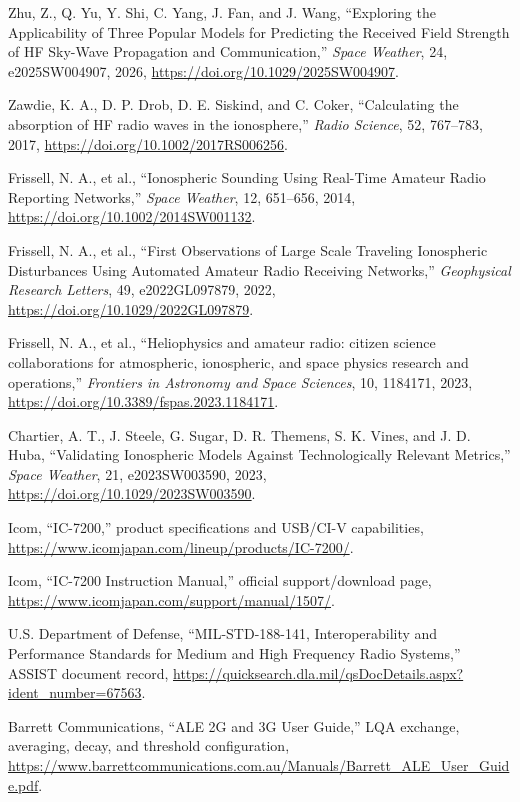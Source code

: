 \documentclass[11pt,a4paper]{article}
\begin{document}
\begin{enumerate}[label={[\arabic*]}]
  \item Zhu, Z., Q. Yu, Y. Shi, C. Yang, J. Fan, and J. Wang, “Exploring the Applicability of Three Popular Models for Predicting the Received Field Strength of HF Sky-Wave Propagation and Communication,” \emph{Space Weather}, 24, e2025SW004907, 2026, \url{https://doi.org/10.1029/2025SW004907}.
  \item Zawdie, K. A., D. P. Drob, D. E. Siskind, and C. Coker, “Calculating the absorption of HF radio waves in the ionosphere,” \emph{Radio Science}, 52, 767--783, 2017, \url{https://doi.org/10.1002/2017RS006256}.
  \item Frissell, N. A., et al., “Ionospheric Sounding Using Real-Time Amateur Radio Reporting Networks,” \emph{Space Weather}, 12, 651--656, 2014, \url{https://doi.org/10.1002/2014SW001132}.
  \item Frissell, N. A., et al., “First Observations of Large Scale Traveling Ionospheric Disturbances Using Automated Amateur Radio Receiving Networks,” \emph{Geophysical Research Letters}, 49, e2022GL097879, 2022, \url{https://doi.org/10.1029/2022GL097879}.
  \item Frissell, N. A., et al., “Heliophysics and amateur radio: citizen science collaborations for atmospheric, ionospheric, and space physics research and operations,” \emph{Frontiers in Astronomy and Space Sciences}, 10, 1184171, 2023, \url{https://doi.org/10.3389/fspas.2023.1184171}.
  \item Chartier, A. T., J. Steele, G. Sugar, D. R. Themens, S. K. Vines, and J. D. Huba, “Validating Ionospheric Models Against Technologically Relevant Metrics,” \emph{Space Weather}, 21, e2023SW003590, 2023, \url{https://doi.org/10.1029/2023SW003590}.
  \item Icom, “IC-7200,” product specifications and USB/CI-V capabilities, \url{https://www.icomjapan.com/lineup/products/IC-7200/}.
  \item Icom, “IC-7200 Instruction Manual,” official support/download page, \url{https://www.icomjapan.com/support/manual/1507/}.
  \item U.S. Department of Defense, “MIL-STD-188-141, Interoperability and Performance Standards for Medium and High Frequency Radio Systems,” ASSIST document record, \url{https://quicksearch.dla.mil/qsDocDetails.aspx?ident_number=67563}.
  \item Barrett Communications, “ALE 2G and 3G User Guide,” LQA exchange, averaging, decay, and threshold configuration, \url{https://www.barrettcommunications.com.au/Manuals/Barrett_ALE_User_Guide.pdf}.

\end{enumerate}
\end{document}
